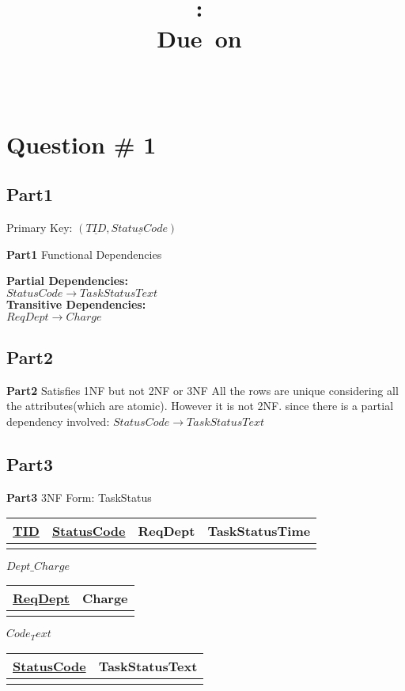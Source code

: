 \documentclass[a4paper,11pt,x11names]{article}
\title{
\vspace{2in}
\textmd{\textbf{\hmwkClass:\ \hmwkTitle}}\\
\normalsize\vspace{0.1in}\small{Due\ on\ \hmwkDueDate}\\
\vspace{3in}
}
\author{\textbf{\hmwkAuthorName} \\
	\textbf{\hmwkAuthorID}
	}
\date{} %
\begin{document}
\maketitle
\clearpage
\section{Question \# 1} %
    \subsection{Part1}
    Primary Key: $(\underline{TID},\underline{StatusCode})$ 
    
    \textbf{Part1} Functional Dependencies
    \newline
   
    \textbf{Partial Dependencies:} \\
    $StatusCode \longrightarrow TaskStatusText$\\

    \textbf{Transitive Dependencies:} \\
    $ReqDept \longrightarrow Charge$
    
    \subsection{Part2}
    \textbf{Part2} Satisfies 1NF but not 2NF or 3NF
    All the rows are unique considering all the attributes(which are atomic). However  it is not 2NF. since there is a partial dependency involved: 
    $StatusCode \longrightarrow TaskStatusText$\\

    \subsection{Part3}
    \textbf{Part3} 3NF Form:	\newline
    TaskStatus
	\begin{tabular}{|c|c|c|c|}
	\hline \underline{TID} & \underline{StatusCode}  & ReqDept  & TaskStatusTime  \\ 
	\hline  &  &  &  \\ 
	\hline 
	\end{tabular} 
	\newline
	$Dept\_Charge$
	\begin{tabular}{|c|c|}
		\hline \underline{ReqDept}  & Charge   \\ 
		\hline  &    \\ 
		\hline 
	\end{tabular} 
	\newline	
	$Code_Text$
	\begin{tabular}{|c|c|}
		\hline \underline{StatusCode}  & TaskStatusText   \\ 
		\hline  &    \\ 
		\hline 
	\end{tabular} 
\end{document}
